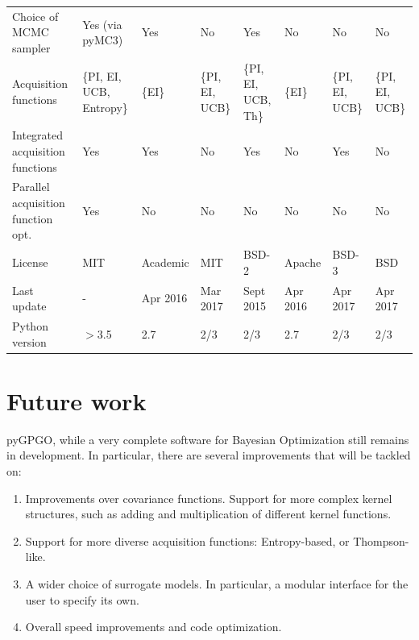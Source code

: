 \documentclass[10pt,a4paper,twoside]{book}
\begin{document}
\begin{table}
\begin{adjustbox}{width=1\textwidth}
\begin{tabular}{@{}llllllll@{}}
Choice of MCMC sampler             & {\color{green} Yes} (via pyMC3)          &  \color{green} Yes          & \color{red} No                       &  \color{green} Yes           &  \color{red} No      & \color{red} No             & \color{red} No               \\
Acquisition functions              & \{PI, EI, UCB, Entropy\} &  \{EI\}          & \{PI, EI, UCB\}           &  \{PI, EI, UCB, Th\}          &  \{EI\}      &       \{PI, EI, UCB\}          & \{PI, EI, UCB\}                   \\
Integrated acquisition functions   & \color{green} Yes                      &  \color{green} Yes       & \color{red} No                       &  \color{green} Yes           &  \color{red} No      & \color{green} Yes             & \color{red} No               \\
Parallel acquisition function opt. & \color{green} Yes                      & \color{red} No        & \color{red} No                       & \color{red} No         &   \color{red} No     & \color{red} No                 & \color{red} No               \\
License                            & MIT                      &   Academic         & MIT                       & BSD-2       & Apache       & BSD-3           & BSD               \\
Last update                        &            -              & Apr 2016 & Mar 2017  & Sept 2015           &   Apr 2016     &  Apr 2017                &     Apr 2017              \\
Python version & $>$3.5 & 2.7 & 2/3 & 2/3 & 2.7 & 2/3 & 2/3 \\ \bottomrule
\end{tabular}
\end{adjustbox}
\end{table}

\newpage
\section{Future work}

pyGPGO, while a very complete software for Bayesian Optimization still remains in development. In particular, there are several improvements that will be tackled on:

\begin{enumerate}
	\item Improvements over covariance functions. Support for more complex kernel structures, such as adding and multiplication of different kernel functions.
	\item Support for more diverse acquisition functions: Entropy-based, or Thompson-like.
	\item A wider choice of surrogate models. In particular, a modular interface for the user to specify its own.
	\item Overall speed improvements and code optimization.
\end{enumerate}
\end{document}
